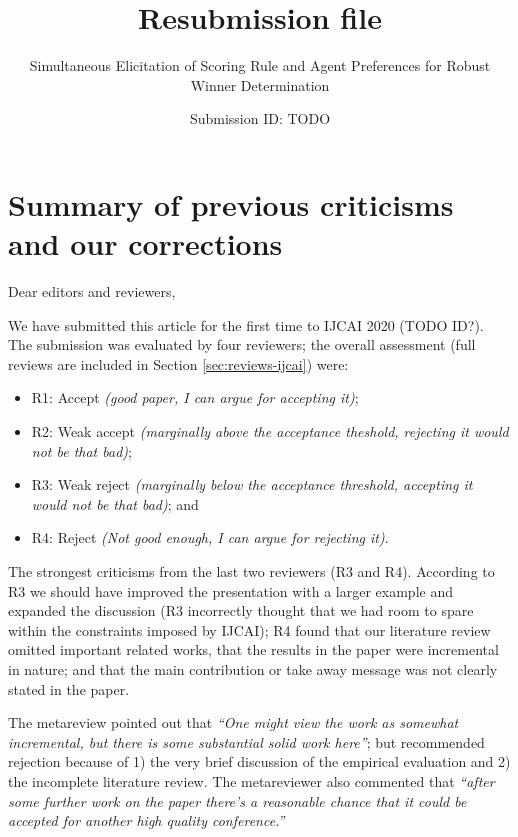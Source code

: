 \documentclass[version=3.21, pagesize, twoside=off, bibliography=totoc, DIV=calc, fontsize=12pt, a4paper]{scrartcl}
\title{Resubmission file}
\subtitle{Simultaneous Elicitation of Scoring Rule and Agent Preferences for Robust Winner Determination}
\author{Submission ID: TODO}
\date{}
\begin{document}
\maketitle

\section{Summary of previous criticisms and our corrections}

Dear editors and reviewers,

\medskip
We have submitted this article for the first time to IJCAI 2020 (TODO ID?). The submission was evaluated by four reviewers; the overall assessment (full reviews are included in Section \ref{sec:reviews-ijcai}) were: 
\begin{itemize}
\item R1: Accept {\em (good paper, I can argue for accepting it)};
\item R2: Weak accept {\em (marginally above the acceptance theshold, rejecting it would not be that bad)};
\item R3: Weak reject {\em (marginally below the acceptance threshold, accepting it would not be that bad)}; and
\item R4:  Reject {\em (Not good enough, I can argue for rejecting it)}.
\end{itemize}

The strongest criticisms from the last two reviewers (R3 and R4). According to R3 we should have improved the presentation with a larger example and expanded the discussion (R3 incorrectly thought that we had room to spare within the constraints imposed by IJCAI);  R4 found that our literature review omitted important related works, that the results in the paper were incremental in nature; and that the main contribution or take away message was not clearly stated in the paper. 

The metareview pointed out that {\em “One might view the work as somewhat incremental, but there is some substantial solid work here”}; but recommended rejection because of 1) the very brief discussion of the empirical evaluation and 2) the incomplete literature review. The metareviewer also commented that {\em “after some further work on the paper there's a reasonable chance that it could be accepted for another high quality conference.”}
\end{document}

